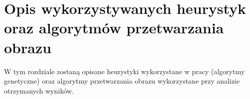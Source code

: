 \chapter{Opis wykorzystywanych heurystyk oraz algorytmów przetwarzania obrazu}
\thispagestyle{chapterBeginStyle}

W tym rozdziale zostaną opisane heurystyki wykorzystane w pracy (algorytmy genetyczne) oraz algorytmy przetwarzania obrazu wykorzystane przy analizie otrzymanych wyników. 
